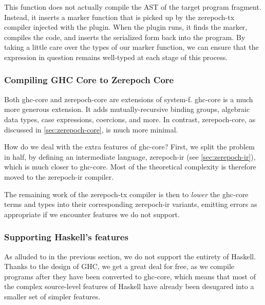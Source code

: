 This function does not actually compile the AST of the target program fragment.
Instead, it inserts a marker function that is picked up by the \gls{zerepoch-tx} compiler injected with the plugin.
When the plugin runs, it finds the marker, compiles the code, and inserts the serialized form back into the program.
By taking a little care over the types of our marker function, we can ensure that the expression in question remains well-typed at each stage of this process.

\subsubsection{Compiling GHC Core to Zerepoch Core}

Both \gls{ghc-core} and \gls{zerepoch-core} are extensions of \gls{system-f}.
\Gls{ghc-core} is a much more generous extension.
It adds mutually-recursive binding groups, algebraic data types, case expressions, coercions, and more.
In contrast, \gls{zerepoch-core}, as discussed in \cref{sec:zerepoch-core}, is much more minimal.

How do we deal with the extra features of \gls{ghc-core}?
First, we split the problem in half, by defining an intermediate language, \gls{zerepoch-ir} (see \cref{sec:zerepoch-ir}), which is much closer to \gls{ghc-core}.
Most of the theoretical complexity is therefore moved to the \gls{zerepoch-ir} compiler.

The remaining work of the \gls{zerepoch-tx} compiler is then to \emph{lower} the \gls{ghc-core} terms and types into their corresponding \gls{zerepoch-ir} variants, emitting errors as appropriate if we encounter features we do not support.

\subsubsection{Supporting Haskell's features}

As alluded to in the previous section, we do not support the entirety of Haskell.
Thanks to the design of GHC, we get a great deal for free, as we compile programs after they have been converted to \gls{ghc-core}, which means that most of the complex source-level features of Haskell have already been desugared into a smaller set of simpler features.

